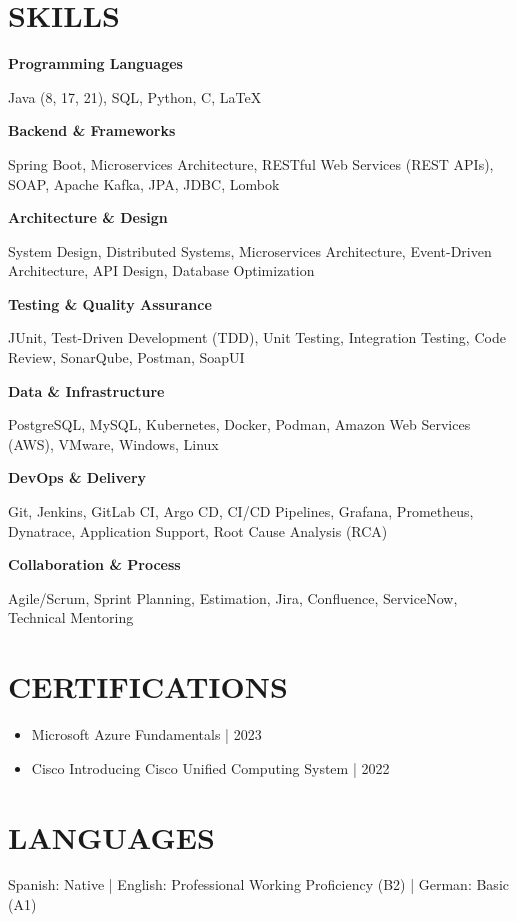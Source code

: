 \documentclass[10pt,a4paper]{article}
\newlength{\singleseparation}
\newcommand{\skill}[1]{
  \vspace{\singleseparation} 
  {\bfseries #1 \par}
  \nopagebreak}
\begin{document}
\section*{SKILLS}
\skill{Programming Languages}
Java (8, 17, 21), SQL, Python, C, LaTeX \par
\skill{Backend \& Frameworks}
Spring Boot, Microservices Architecture, RESTful Web Services (REST APIs), SOAP, Apache Kafka, JPA, JDBC, Lombok \par
\skill{Architecture \& Design}
System Design, Distributed Systems, Microservices Architecture, Event-Driven Architecture, API Design, Database Optimization \par
\skill{Testing \& Quality Assurance}
JUnit, Test-Driven Development (TDD), Unit Testing, Integration Testing, Code Review, SonarQube, Postman, SoapUI \par
\skill{Data \& Infrastructure}
PostgreSQL, MySQL, Kubernetes, Docker, Podman, Amazon Web Services (AWS), VMware, Windows, Linux \par
\skill{DevOps \& Delivery}
Git, Jenkins, GitLab CI, Argo CD, CI/CD Pipelines, Grafana, Prometheus, Dynatrace, Application Support, Root Cause Analysis (RCA) \par
\skill{Collaboration \& Process}
Agile/Scrum, Sprint Planning, Estimation, Jira, Confluence, ServiceNow, Technical Mentoring \par

\section*{CERTIFICATIONS}
\vspace{\singleseparation}
\begin{itemize}
  \item Microsoft Azure Fundamentals | 2023
  \item Cisco Introducing Cisco Unified Computing System | 2022
\end{itemize}

\section*{LANGUAGES}
\vspace{\singleseparation}
Spanish: Native | English: Professional Working Proficiency (B2) | German: Basic (A1) \par
\end{document}
